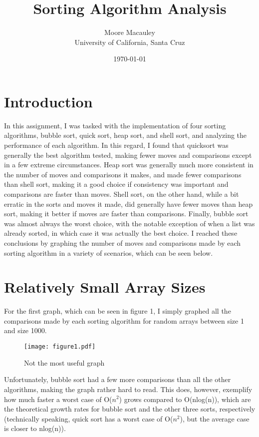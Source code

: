 \documentclass[11pt]{article}
\title{Sorting Algorithm Analysis}
\author{Moore Macauley \\ University of California, Santa Cruz}
\date{\today}
\begin{document}
\maketitle

\section{Introduction}

In this assignment, I was tasked with the implementation of four sorting algorithms, bubble sort, quick sort, heap sort, and shell sort, and analyzing the performance of each algorithm. In this regard, I found that quicksort was generally the best algorithm tested, making fewer moves and comparisons except in a few extreme circumstances. Heap sort was generally much more consistent in the number of moves and comparisons it makes, and made fewer comparisons than shell sort, making it a good choice if consistency was important and comparisons are faster than moves. Shell sort, on the other hand, while a bit erratic in the sorts and moves it made, did generally have fewer moves than heap sort, making it better if moves are faster than comparisons. Finally, bubble sort was almost always the worst choice, with the notable exception of when a list was already sorted, in which case it was actually the best choice. I reached these conclusions by graphing the number of moves and comparisons made by each sorting algorithm in a variety of scenarios, which can be seen below.

\section{Relatively Small Array Sizes}

For the first graph, which can be seen in figure 1, I simply graphed all the comparisons made by each sorting algorithm for random arrays between size 1 and size 1000.

\begin{figure}[tbp]
\begin{centering}
\texttt{[image: figure1.pdf]}
\caption{Not the most useful graph}
\end{centering}
\end{figure}

Unfortunately, bubble sort had a few more comparisons than all the other algorithms, making the graph rather hard to read. This does, however, exemplify how much faster a worst case of O($n^2$) grows compared to O(nlog(n)), which are the theoretical growth rates for bubble sort and the other three sorts, respectively (technically speaking, quick sort has a worst case of O($n^2$), but the average case is closer to nlog(n)).
\end{document}
